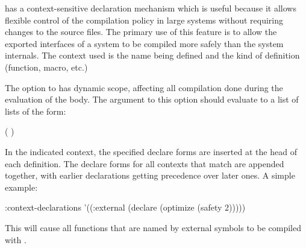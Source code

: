 \cmucl{} has a context-sensitive declaration mechanism which is useful because it
allows flexible control of the compilation policy in large systems without
requiring changes to the source files.  The primary use of this feature is to
allow the exported interfaces of a system to be compiled more safely than the
system internals.  The context used is the name being defined and the kind of
definition (function, macro, etc.) 

The  option to  has
dynamic scope, affecting all compilation done during the evaluation of the
body.  The argument to this option should evaluate to a list of lists of the
form:
\begin{example}
( )
\end{example}
In the indicated context, the specified declare forms are inserted at
the head of each definition.  The declare forms for all contexts that
match are appended together, with earlier declarations getting
precedence over later ones.  A simple example:
\begin{example}
    :context-declarations
    '((:external (declare (optimize (safety 2)))))
\end{example}
This will cause all functions that are named by external symbols to be
compiled with .

